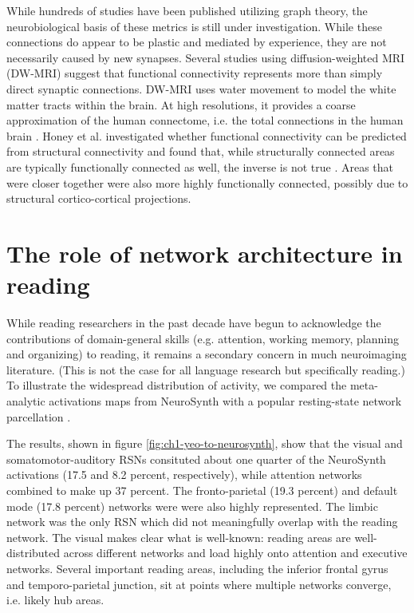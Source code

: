 While hundreds of studies have been published utilizing graph theory, the neurobiological basis of these metrics is still under investigation. While these connections do appear to be plastic and mediated by experience, they are not necessarily caused by new synapses. Several studies using diffusion-weighted MRI (DW-MRI) suggest that functional connectivity represents more than simply direct synaptic connections. DW-MRI uses water movement to model the white matter tracts within the brain. At high resolutions, it provides a coarse approximation of the human connectome, i.e. the total connections in the human brain \citep{Sporns2005}. Honey et al. investigated whether functional connectivity can be predicted from structural connectivity and found that, while structurally connected areas are typically functionally connected as well, the inverse is not true \citep{Honey2009}. Areas that were closer together were also more highly functionally connected, possibly due to structural cortico-cortical projections. 


\section{The role of network architecture in reading}
While reading researchers in the past decade have begun to acknowledge the contributions of domain-general skills (e.g. attention, working memory, planning and organizing) to reading, it remains a secondary concern in much neuroimaging literature. (This is not the case for all language research but specifically reading.) To illustrate the widespread distribution of activity, we compared the meta-analytic activations maps from NeuroSynth with a popular resting-state network parcellation \citep{Bailey2018}. 

The results, shown in figure \ref{fig:ch1-yeo-to-neurosynth}, show that the visual and somatomotor-auditory RSNs consituted about one quarter of the NeuroSynth activations (17.5 and 8.2 percent, respectively), while attention networks combined to make up 37 percent. The fronto-parietal (19.3 percent) and default mode (17.8 percent) networks were were also highly represented. The limbic network was the only RSN which did not meaningfully overlap with the reading network. The visual makes clear what is well-known: reading areas are well-distributed across different networks and load highly onto attention and executive networks. Several important reading areas, including the inferior frontal gyrus and temporo-parietal junction, sit at points where multiple networks converge, i.e. likely hub areas.

